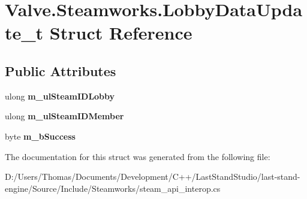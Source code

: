 \hypertarget{structValve_1_1Steamworks_1_1LobbyDataUpdate__t}{}\section{Valve.\+Steamworks.\+Lobby\+Data\+Update\+\_\+t Struct Reference}
\label{structValve_1_1Steamworks_1_1LobbyDataUpdate__t}
\subsection*{Public Attributes}
\begin{DoxyCompactItemize}
\item 
\hypertarget{structValve_1_1Steamworks_1_1LobbyDataUpdate__t_a9e0a9e2b40bdec6a3e1ca88b1e312023}{}ulong {\bfseries m\+\_\+ul\+Steam\+I\+D\+Lobby}\label{structValve_1_1Steamworks_1_1LobbyDataUpdate__t_a9e0a9e2b40bdec6a3e1ca88b1e312023}

\item 
\hypertarget{structValve_1_1Steamworks_1_1LobbyDataUpdate__t_ae9169f89a5cf77aef54561e5478d67f8}{}ulong {\bfseries m\+\_\+ul\+Steam\+I\+D\+Member}\label{structValve_1_1Steamworks_1_1LobbyDataUpdate__t_ae9169f89a5cf77aef54561e5478d67f8}

\item 
\hypertarget{structValve_1_1Steamworks_1_1LobbyDataUpdate__t_abef91474d402de3db8ac8b10527c9c57}{}byte {\bfseries m\+\_\+b\+Success}\label{structValve_1_1Steamworks_1_1LobbyDataUpdate__t_abef91474d402de3db8ac8b10527c9c57}

\end{DoxyCompactItemize}


The documentation for this struct was generated from the following file\+:\begin{DoxyCompactItemize}
\item 
D\+:/\+Users/\+Thomas/\+Documents/\+Development/\+C++/\+Last\+Stand\+Studio/last-\/stand-\/engine/\+Source/\+Include/\+Steamworks/steam\+\_\+api\+\_\+interop.\+cs\end{DoxyCompactItemize}
